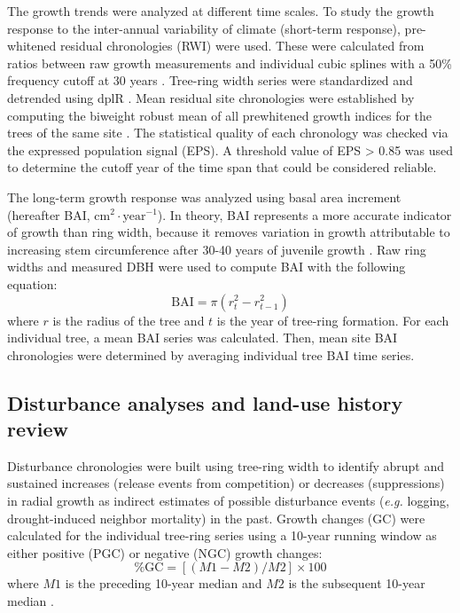 The growth trends were analyzed at different time scales. To study the growth response to the inter-annual variability of climate (short-term response), pre-whitened residual chronologies (RWI) were used. These were calculated from ratios between raw growth measurements and individual cubic splines with a 50\% frequency cutoff at 30 years \autocite{Fritts1976TreeRings}. Tree-ring width series were standardized and detrended using dplR \autocite{Bunn2010StatisticalVisual}. Mean residual site chronologies were established by computing the biweight robust mean of all prewhitened growth indices for the trees of the same site \autocite{Fritts1976TreeRings}. The statistical quality of each chronology was checked via the expressed population signal (EPS). A threshold value of EPS \textgreater{} 0.85 was used to determine the cutoff year of the time span that could be considered reliable.

The long-term growth response was analyzed using basal area increment (hereafter BAI, \(\mathrm{cm^2 \cdot year^{-1}}\)). In theory, BAI represents a more accurate indicator of growth than ring width, because it removes variation in growth attributable to increasing stem circumference after 30-40 years of juvenile growth \autocite{BiondiQeadan2008TheorydrivenApproach}. Raw ring widths and measured DBH were used to compute BAI \autocite{Piovesanetal2008DroughtdrivenGrowth} with the following equation: \[\mathrm{BAI} = \pi(r^2_{t}-r^2_{t-1})\] where \(r\) is the radius of the tree and \(t\) is the year of tree-ring formation. For each individual tree, a mean BAI series was calculated. Then, mean site BAI chronologies were determined by averaging individual tree BAI time series.

\subsection{Disturbance analyses and land-use history review}\label{sec:dendro:Disurbance}
Disturbance chronologies were built using tree-ring width to identify abrupt and sustained increases (release events from competition) or decreases (suppressions) in radial growth \autocite{NowackiAbrams1997RadialgrowthAveraging} as indirect estimates of possible disturbance events (\emph{e.g.} logging, drought-induced neighbor mortality) in the past. Growth changes (GC) were calculated for the individual tree-ring series using a 10-year running window as either positive (PGC) or negative (NGC) growth changes: \[\mathrm{\% GC} = \left[(M1 - M2)\Big/ M2\right] \times 100\] where \(M1\) is the preceding 10-year median and \(M2\) is the subsequent 10-year median \autocite{RubinoMcCarthy2004ComparativeAnalysis}.

